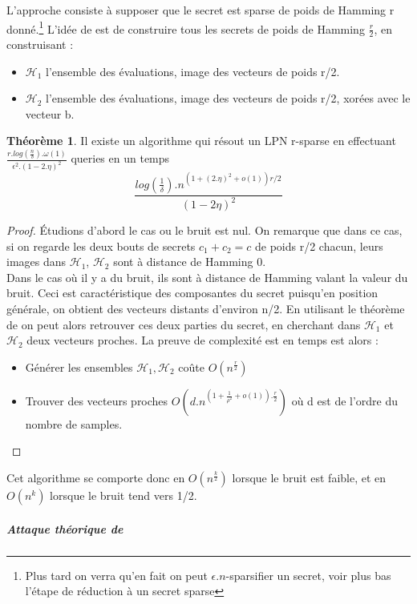\documentclass{article}		%
\theoremstyle{definition}
\newtheorem{theo}{Théorème}
\theoremstyle{plain}
\theoremstyle{plain}
\theoremstyle{plain}
\theoremstyle{plain}
\begin{document}
  L'approche consiste à supposer que le secret est sparse de poids de
  Hamming r
  donné.\footnote{Plus tard on verra qu'en fait on peut $\epsilon.n$-sparsifier un
  secret, voir plus bas l'étape de réduction à un secret sparse}
  L'idée de \cite{Grigo} est de construire tous les secrets de poids de
  Hamming $\frac{r}{2}$, en construisant :
\begin{itemize}
      \item $\mathcal{H}_1$ l'ensemble des évaluations, image des vecteurs de
      poids r/2.
      \item $\mathcal{H}_2$ l'ensemble des évaluations, image des vecteurs de
      poids r/2, xorées avec le vecteur b.
\end{itemize}  
\begin{theo} Il existe un algorithme qui résout un LPN r-sparse en
    effectuant
    $\frac{r.log(\frac{n}{\delta}).\omega(1)}{\epsilon^2.(1-2.\eta)^2}$
    queries en un temps
    $$\frac{log(\frac{1}{\delta}).n^{(1+(2.\eta)^2+o(1))r/2}}{(1-2\eta)^2}$$
\end{theo}
\begin{proof} Étudions d'abord le cas ou le bruit est nul. On
  remarque que dans ce cas, si on regarde les deux bouts de secrets $c_1+c_2=c$ de poids
  r/2 chacun, leurs images dans $\mathcal{H}_1$, $\mathcal{H}_2$ sont à
  distance de Hamming 0. \\
  Dans le cas où il y a du bruit, ils sont à
  distance de Hamming valant la valeur du bruit. Ceci est caractéristique
  des composantes du secret puisqu'en position générale, on obtient des
  vecteurs distants d'environ n/2. En utilisant le théorème de \cite{Indyk}
  on peut alors retrouver ces deux parties du secret, en cherchant dans
  $\mathcal{H}_1$ et $\mathcal{H}_2$ deux vecteurs proches. La preuve de complexité
  est en temps est alors :
\begin{itemize}
\item Générer les ensembles $\mathcal{H}_1,\mathcal{H}_2$ coûte
$O(n^\frac{r}{2})$  
\item Trouver des vecteurs proches
$O(d.n^{(1+\frac{1}{\rho^2}+o(1)).\frac{r}{2}})$ où d est de l'ordre du
nombre de samples. 
\end{itemize} 
\end{proof}
Cet algorithme se comporte donc en $O(n^{\frac{k}{2}})$ lorsque le bruit
est faible, et en $O(n^k)$ lorsque le bruit tend vers 1/2.

\subparagraph{Attaque théorique de \cite{Valiant}} 
\end{document}
